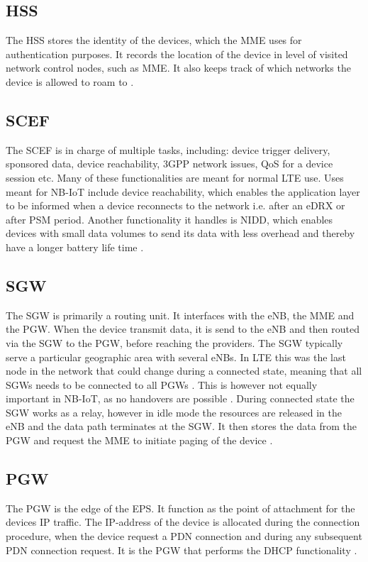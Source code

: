 \subsection{\gls{HSS}}
The \gls{HSS} stores the identity of the devices, which the \gls{MME} uses for authentication purposes. It records the location of the device in level of visited network control nodes, such as \gls{MME}. It also keeps track of which networks the device is allowed to roam to \citep[ch. 3]{book_LTE_for_UMTS}.

\subsection{\gls{SCEF}}
The \gls{SCEF} is in charge of multiple tasks, including: device trigger delivery, sponsored data, device reachability, \gls{3GPP} network issues, \gls{QoS} for a device session etc. Many of these functionalities are meant for normal \gls{LTE} use. Uses meant for \gls{NB-IoT} include device reachability, which enables the application layer to be informed when a device reconnects to the network i.e. after an \gls{eDRX} or after \gls{PSM} period. Another functionality it handles is \gls{NIDD}, which enables devices with small data volumes to send its data with less overhead and thereby have a longer battery life time .

\subsection{\gls{SGW}}
The \gls{SGW} is primarily a routing unit. It interfaces with the \gls{eNB}, the \gls{MME} and the \gls{PGW}. When the device transmit data, it is send to the \gls{eNB} and then routed via the \gls{SGW} to the \gls{PGW}, before reaching the providers. The \gls{SGW} typically serve a particular geographic area with several \gls{eNB}s. In \gls{LTE} this was the last node in the network that could change during a connected state, meaning that all \gls{SGW}s needs to be connected to all \gls{PGW}s \citep[ch. 3]{book_LTE_for_UMTS}. This is however not equally important in \gls{NB-IoT}, as no handovers are possible \citep{REL-13}. During connected state the \gls{SGW} works as a relay, however in idle mode the resources are released in the \gls{eNB} and the data path terminates at the \gls{SGW}. It then stores the data from the \gls{PGW} and request the \gls{MME} to initiate paging of the device \citep[ch. 3]{book_LTE_for_UMTS}.

\subsection{\gls{PGW}}
The \gls{PGW} is the edge of the \gls{EPS}. It function as the point of attachment for the devices \gls{IP} traffic. The \gls{IP}-address of the device is allocated during the connection procedure, when the device request a \gls{PDN} connection and during any subsequent \gls{PDN} connection request. It is the \gls{PGW} that performs the \gls{DHCP} functionality \citep[ch. 3]{book_LTE_for_UMTS}.

